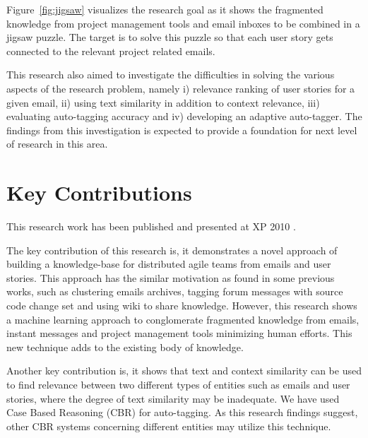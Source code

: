 Figure~\ref{fig:jigsaw} visualizes the research goal as it shows the fragmented knowledge from project management tools and email inboxes to be combined in a jigsaw puzzle. The target is to solve this puzzle so that each user story gets connected to the relevant project related emails.

This research also aimed to investigate the difficulties in solving the various aspects of the research problem, namely i) relevance ranking of user stories for a given email, ii) using text similarity in addition to context relevance, iii) evaluating auto-tagging accuracy and iv) developing an adaptive auto-tagger. The findings from this investigation is expected to provide a foundation for next level of research in this area.

\section{Key Contributions}
This research work has been published and presented at XP 2010 \cite{auto_tagging}. 

The key contribution of this research is, it demonstrates a novel approach of building a knowledge-base for distributed agile teams from emails and user stories. This approach has the similar motivation as found in some previous works, such as clustering emails archives\cite{using_hybrid}, tagging forum messages with source code change set\cite{hipikat, hipikat_2} and using wiki to share knowledge. However, this research shows a machine learning approach to conglomerate fragmented knowledge from emails, instant messages and project management tools minimizing human efforts. This new technique adds to the existing body of knowledge.
                                  
Another key contribution is, it shows that text and context similarity can be used to find relevance between two different types of entities such as emails and user stories, where the degree of text similarity may be inadequate. We have used Case Based Reasoning (CBR) for auto-tagging. As this research findings suggest, other CBR systems concerning different entities may utilize this technique.
